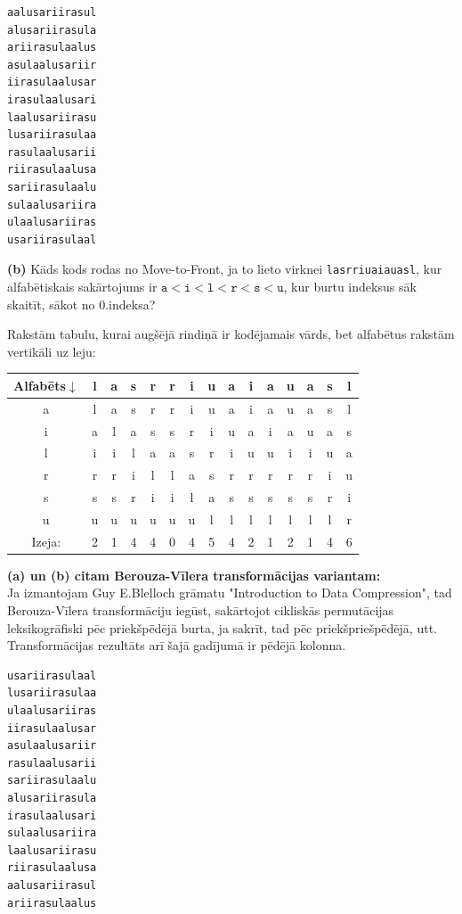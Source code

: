 \documentclass[11pt]{article}
\begin{document}
\begin{verbatim}
aalusariirasul
alusariirasula
ariirasulaalus
asulaalusariir
iirasulaalusar
irasulaalusari
laalusariirasu
lusariirasulaa
rasulaalusarii
riirasulaalusa
sariirasulaalu
sulaalusariira
ulaalusariiras
usariirasulaal
\end{verbatim}

\noindent
{\bf (b)} Kāds kods rodas no Move-to-Front, ja to lieto 
virknei {\tt lasrriuaiauasl}, kur alfabētiskais
sakārtojums ir $\mathtt{a}<\mathtt{i}<\mathtt{l}<\mathtt{r}<\mathtt{s}<\mathtt{u}$, kur burtu indeksus sāk skaitīt, 
sākot no 0.indeksa?

\noindent
Rakstām tabulu, kurai augšējā rindiņā ir kodējamais vārds, bet
alfabētus rakstām vertikāli uz leju:\\
\begin{tabular}{c|cccccccccccccc}
Alfabēts$\downarrow$ & l & a & s & r & r & i & u & a & i & a & u & a & s & l \\ \hline
a                    & l & a & s & r & r & i & u & a & i & a & u & a & s & l \\ 
i                    & a & l & a & s & s & r & i & u & a & i & a & u & a & s \\ 
l                    & i & i & l & a & a & s & r & i & u & u & i & i & u & a \\ 
r                    & r & r & i & l & l & a & s & r & r & r & r & r & i & u \\ 
s                    & s & s & r & i & i & l & a & s & s & s & s & s & r & i \\ 
u                    & u & u & u & u & u & u & l & l & l & l & l & l & l & r \\ \hline
Izeja:               & 2 & 1 & 4 & 4 & 0 & 4 & 5 & 4 & 2 & 1 & 2 & 1 & 4 & 6 
\end{tabular}


\noindent
{\bf (a) un (b) citam Berouza-Vīlera transformācijas variantam:}\\
Ja izmantojam Guy E.Blelloch grāmatu "Introduction to Data Compression", tad
Berouza-Vīlera transformāciju iegūst, sakārtojot cikliskās permutācijas
leksikogrāfiski pēc priekšpēdējā burta, ja sakrīt, tad pēc priekšpriešpēdējā, utt. 
Transformācijas rezultāts arī šajā gadījumā ir pēdējā kolonna. 

\begin{verbatim}
usariirasulaal
lusariirasulaa
ulaalusariiras
iirasulaalusar
asulaalusariir
rasulaalusarii
sariirasulaalu
alusariirasula
irasulaalusari
sulaalusariira
laalusariirasu
riirasulaalusa
aalusariirasul
ariirasulaalus
\end{verbatim}
\end{document}
